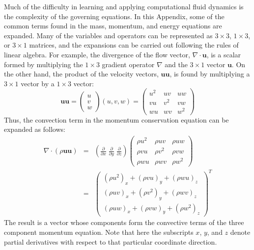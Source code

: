 \documentclass[graybox]{svmult}
\begin{document}
Much of the difficulty in learning and applying computational fluid dynamics is the complexity of the governing equations. In this Appendix, some of the common terms found in the mass, momentum, and energy equations are expanded. Many of the variables and operators can be represented as $3 \times 3$, $1 \times 3$, or $3 \times 1$ matrices, and the expansions can be carried out following the rules of linear algebra. For example, the divergence of the flow vector, $\nabla \cdot \mathbf{u}$, is a scalar formed by multiplying the $1 \times 3$ gradient operator $\nabla$ and the $3 \times 1$ vector $\mathbf{u}$. On the other hand, the product of the velocity vectors, $\mathbf{u} \mathbf{u}$, is found by multiplying a $3 \times 1$ vector by a $1 \times 3$ vector:
\begin{equation}
\mathbf{u}\mathbf{u} = \left( \begin{array}{c} u \\ v \\ w \end{array} \right) (u,v,w) = \left( \begin{array}{ccc} u^2 & uv & uw \\ vu & v^2 & vw \\ wu & wv & w^2 \end{array} \right)
\label{matmult}
\end{equation}
Thus, the convection term in the momentum conservation equation can be expanded as follows:
\begin{eqnarray}
\nabla \cdot (\rho \mathbf{u}\mathbf{u})
&=& \left( \frac{\partial}{\partial x} \; \frac{\partial}{\partial y} \; \frac{\partial}{\partial z} \right)
    \left( \begin{array}{ccc} \rho u^2 & \rho uv & \rho uw \\ \rho vu & \rho v^2 & \rho vw \\ \rho wu & \rho wv & \rho w^2 \end{array} \right) \nonumber \\
&=& \left( \begin{array}{c} (\rho u^2)_x + (\rho vu)_y + (\rho wu)_z \\ (\rho uv)_x + (\rho v^2)_y + (\rho wv)_z \\ (\rho uw)_x + (\rho vw)_y + (\rho w^2)_z \end{array} \right)^T
\end{eqnarray}
The result is a vector whose components form the convective terms of the three component momentum equation. Note that here the subscripts $x$, $y$, and $z$ denote partial derivatives with  respect to that particular coordinate direction.
\end{document}
